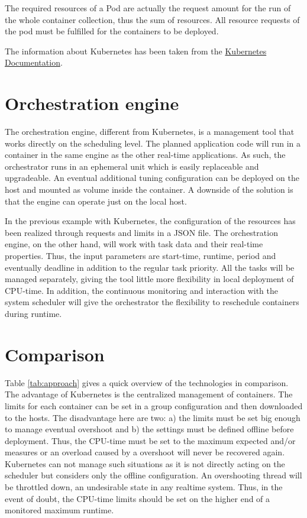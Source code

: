 \documentclass[]{scrartcl}
\begin{document}
The required resources of a Pod are actually the request amount for the run of the whole container collection, thus the sum of resources. All resource requests of the pod must be fulfilled for the containers to be deployed.

The information about Kubernetes has been taken from the
\href{https://kubernetes.io/docs/concepts/configuration/manage-compute-resources-container/}{Kubernetes Documentation}.


\section{Orchestration engine}

The orchestration engine, different from Kubernetes, is a management tool that works directly on the scheduling level. The planned application code will run in a container in the same engine as the other real-time applications. 
As such, the orchestrator runs in an ephemeral unit which is easily replaceable and upgradeable. An eventual additional tuning configuration can be deployed on the host and mounted as volume inside the container. 
A downside of the solution is that the engine can operate just on the local host.

In the previous example with Kubernetes, the configuration of the resources has been realized through requests and limits in a JSON file. 
The orchestration engine, on the other hand, will work with task data and their real-time properties. 
Thus, the input parameters are start-time, runtime, period and eventually deadline in addition to the regular task priority.
All the tasks will be managed separately, giving the tool little more flexibility in local deployment of CPU-time.
In addition, the continuous monitoring and interaction with the system scheduler will give the orchestrator the flexibility to reschedule containers during runtime.

\section{Comparison}

Table \ref{tab:approach} gives a quick overview of the technologies in comparison.
The advantage of Kubernetes is the centralized management of containers. 
The limits for each container can be set in a group configuration and then downloaded to the hosts. 
The disadvantage here are two: a) the limits must be set big enough to manage eventual overshoot and b) the settings must be defined offline before deployment.
Thus, the CPU-time must be set to the maximum expected and/or measures or an overload caused by a overshoot will never be recovered again.
Kubernetes can not manage such situations as it is not directly acting on the scheduler but considers only the offline configuration. 
An overshooting thread will be throttled down, an undesirable state in any realtime system.
Thus, in the event of doubt, the CPU-time limits should be set on the higher end of a monitored maximum runtime.
\end{document}
